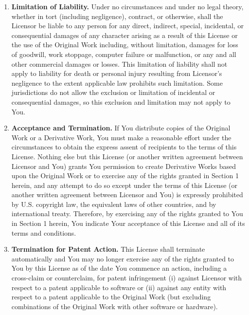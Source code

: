 \begin{it}
\begin{enumerate}
\item \textbf{Limitation of Liability.}  Under no circumstances and under no legal theory, whether in 
      tort (including negligence), contract, or otherwise, shall the Licensor be liable to any person for 
	  any direct, indirect, special, incidental, or consequential damages of any character arising 
	  as a result of this License or the use of the Original Work including, without limitation, 
	  damages for loss of goodwill, work stoppage, computer failure or malfunction, or any and all 
	  other commercial damages or losses. This limitation of liability shall not apply to liability 
	  for death or personal injury resulting from Licensor's negligence to the extent applicable law 
	  prohibits such limitation. Some jurisdictions do not allow the exclusion or limitation of 
	  incidental or consequential damages, so this exclusion and limitation may not apply to You. 

\item \textbf{Acceptance and Termination.}  If You distribute copies of the Original Work or a 
      Derivative Work, You must make a reasonable effort under the circumstances to 
      obtain the express assent of recipients to the terms of this License. Nothing 
      else but this License (or another written agreement between Licensor and You) 
      grants You permission to create Derivative Works based upon the Original Work 
      or to exercise any of the rights granted in Section 1 herein, and any attempt 
      to do so except under the terms of this License (or another written agreement 
      between Licensor and You) is expressly prohibited by U.S. copyright law, the 
      equivalent laws of other countries, and by international treaty. Therefore, 
      by exercising any of the rights granted to You in Section 1 herein, You indicate 
      Your acceptance of this License and all of its terms and conditions. 

\item \textbf{Termination for Patent Action.}  This License shall terminate automatically 
      and You may no longer exercise any of the rights granted to You by this License 
      as of the date You commence an action, including a cross-claim or counterclaim, 
      for patent infringement (i) against Licensor with respect to a patent applicable 
      to software or (ii) against any entity with respect to a patent applicable to 
      the Original Work (but excluding combinations of the Original Work with other 
      software or hardware). 


\end{enumerate}
\end{it}
